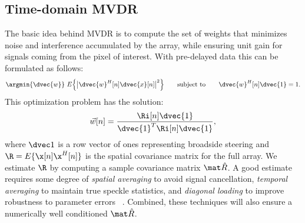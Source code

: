 {\subsection{Time-domain MVDR}

%
The basic idea behind MVDR is to compute the set of weights that minimizes noise and interference accumulated by the array, while ensuring unit gain for signals coming from the pixel of interest. With pre-delayed data this can be formulated as follows:
%
\begin{gather}
\argmin{\dvec{w}}\ E\Big\{\big|\dvec{w}^H[n]\dvec{x}[n]\big|^2\Big\} \qquad\text{subject to}\qquad \dvec{w}^H[n]\dvec{1} = 1. \label{2_eq_mvdr_def}
\end{gather}
%
This optimization problem has the solution:
%
\begin{gather}
\vec w[n] = \frac{\Ri[n]\dvec{1}}{\dvec{1}^T\Ri[n]\dvec{1}},\label{2_eq_weights}
\end{gather}
%
where $\dvec1$ is a row vector of ones representing broadside steering and $\R=E\{\x[n]\x^H[n]\}$ is the spatial covariance matrix for the full array. We estimate $\R$ by computing a sample covariance matrix $\eR$. A good estimate requires some degree of \emph{spatial averaging} to avoid signal cancellation, \emph{temporal averaging} to maintain true speckle statistics, and \emph{diagonal loading} to improve robustness to parameter errors ~\cite{Synnevag2009a}. Combined, these techniques will also ensure a numerically well conditioned $\eR$. 

}
